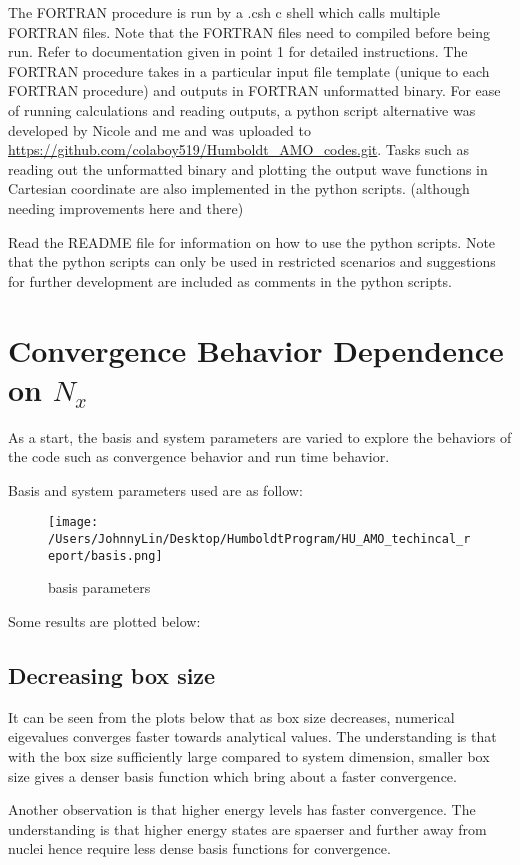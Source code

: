 \documentclass [11pt,a4paper]{report}
\begin{document}
The FORTRAN procedure is run by a .csh c shell which calls multiple FORTRAN files. Note that the FORTRAN files need to compiled before being run. Refer to documentation given in point 1 for detailed instructions. The FORTRAN procedure takes in a particular input file template (unique to each FORTRAN procedure) and outputs in FORTRAN unformatted binary. For ease of running calculations and reading outputs, a python script alternative was developed by Nicole and me and was uploaded to \url{https://github.com/colaboy519/Humboldt_AMO_codes.git}. Tasks such as reading out the unformatted binary and plotting the output wave functions in Cartesian coordinate are also implemented in the python scripts. (although needing improvements here and there)

Read the README file for information on how to use the python scripts. Note that the python scripts can only be used in restricted scenarios and suggestions for further development are included as comments in the python scripts.

%
%
\section{Convergence Behavior Dependence on $N_x$}
\label{sec:N_x_convergence}
As a start, the basis and system parameters are varied to explore the behaviors of the code such as convergence behavior and run time behavior.

Basis and system parameters used are as follow:
\begin{figure}[H]
  \centering
  \texttt{[image: /Users/JohnnyLin/Desktop/HumboldtProgram/HU\_AMO\_techincal\_report/basis.png]}
  \caption{basis parameters}
  \label{basis_parameters}
\end{figure}

Some results are plotted below:

\subsection{Decreasing box size}
\label{sec:decreasing_box_size}
It can be seen from the plots below that as box size decreases, numerical eigevalues converges faster towards analytical values. The understanding is that with the box size sufficiently large compared to system dimension, smaller box size gives a denser basis function which bring about a faster convergence.

Another observation is that higher energy levels has faster convergence. The understanding is that higher energy states are spaerser and further away from nuclei hence require less dense basis functions for convergence.
\end{document}
